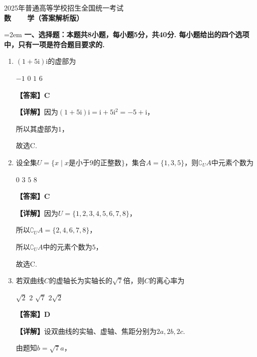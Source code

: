 \documentclass[12pt,a4paper]{article}
\begin{document}
	
	\vspace*{0.5cm}
	
	\begin{center}
		{\Large 2025年普通高等学校招生全国统一考试}\\[0.8cm]
		{\LARGE\bfseries 数~~~~学（答案解析版）}
	\end{center}
	
	\vspace{0.3cm}
	
	\noindent\hangindent=2em {\bfseries 一、选择题：本题共8小题，每小题5分，共40分. 每小题给出的四个选项中，只有一项是符合题目要求的.}
	\begin{enumerate}[leftmargin=*,label=\arabic*.,itemsep=0.8ex]
		\item $(1+5\mathrm{i})\mathrm{i}$的虚部为
		\begin{choicesFour}
			\choice $-1$ \choice $0$ \choice $1$ \choice $6$
		\end{choicesFour}
		\textbf{【答案】C}
		
		\textbf{【详解】}因为$(1+5\mathrm{i})\mathrm{i}=\mathrm{i}+5\mathrm{i}^2=-5+\mathrm{i}$，
		
		所以其虚部为$1$，
		
		故选C.
		
		\item 设全集$U=\{x\mid x\text{是小于}9\text{的正整数}\}$，集合$A=\{1,3,5\}$，则$\complement_U A$中元素个数为
		\begin{choicesFour}
			\choice $0$ \choice $3$ \choice $5$ \choice $8$
		\end{choicesFour}
		\textbf{【答案】C}
		
		\textbf{【详解】}因为$U=\{1,2,3,4,5,6,7,8\}$，
		
		所以$\complement_U A=\{2,4,6,7,8\}$，
		
		所以$\complement_U A$中的元素个数为$5$，
		
		故选C.
		
		\item 若双曲线$C$的虚轴长为实轴长的$\sqrt7$倍，则$C$的离心率为
		\begin{choicesFour}
			\choice $\sqrt2$ \choice $2$ \choice $\sqrt7$ \choice $2\sqrt2$
		\end{choicesFour}
		\textbf{【答案】D}
		
		\textbf{【详解】}设双曲线的实轴、虚轴、焦距分别为$2a,2b,2c$.
		
		由题知$b=\sqrt7 a$，
		

\end{enumerate}
\end{document}
